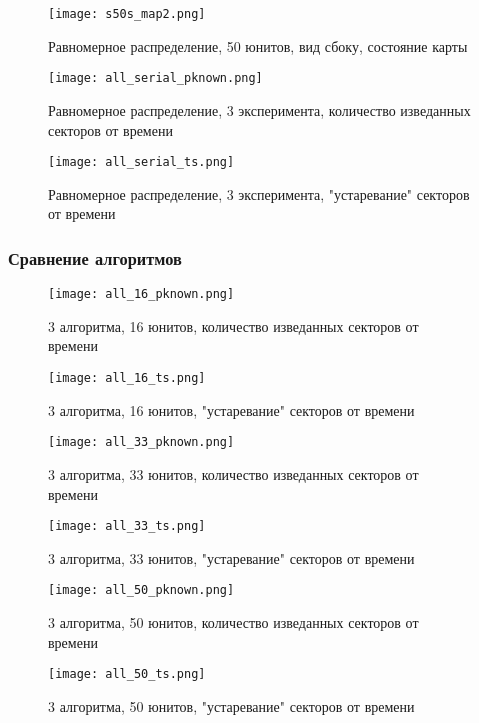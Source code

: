 \begin{figure}[h!]
    \centering
    \texttt{[image: s50s\_map2.png]}
    \caption{Равномерное распределение, 50 юнитов, вид сбоку, состояние карты}
\end{figure}

\begin{figure}[h!]
    \centering
    \texttt{[image: all\_serial\_pknown.png]}
    \caption{Равномерное распределение, 3 эксперимента, количество изведанных секторов от времени}
\end{figure}

\begin{figure}[h!]
    \centering
    \texttt{[image: all\_serial\_ts.png]}
    \caption{Равномерное распределение, 3 эксперимента, "устаревание" секторов от времени}
\end{figure}

\clearpage
\newpage

\subsubsection{Сравнение алгоритмов}

\begin{figure}[h!]
    \centering
    \texttt{[image: all\_16\_pknown.png]}
    \caption{3 алгоритма, 16 юнитов, количество изведанных секторов от времени}
\end{figure}

\begin{figure}[h!]
    \centering
    \texttt{[image: all\_16\_ts.png]}
    \caption{3 алгоритма, 16 юнитов, "устаревание" секторов от времени}
\end{figure}

\begin{figure}[h!]
    \centering
    \texttt{[image: all\_33\_pknown.png]}
    \caption{3 алгоритма, 33 юнитов, количество изведанных секторов от времени}
\end{figure}

\begin{figure}[h!]
    \centering
    \texttt{[image: all\_33\_ts.png]}
    \caption{3 алгоритма, 33 юнитов, "устаревание" секторов от времени}
\end{figure}

\begin{figure}[h!]
    \centering
    \texttt{[image: all\_50\_pknown.png]}
    \caption{3 алгоритма, 50 юнитов, количество изведанных секторов от времени}
\end{figure}

\begin{figure}[h!]
    \centering
    \texttt{[image: all\_50\_ts.png]}
    \caption{3 алгоритма, 50 юнитов, "устаревание" секторов от времени}
\end{figure}

\clearpage
\newpage
